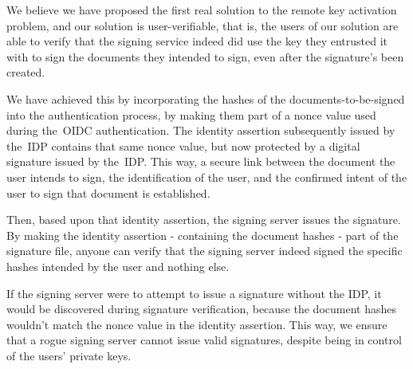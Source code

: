 We believe we have proposed the first real solution to the remote key activation problem,
and our solution is user-verifiable,
that is,
the users of our solution are able to verify that the signing service indeed did use the key they entrusted it with to sign the documents they intended to sign,
even after the signature's been created.

We have achieved this by incorporating the hashes of the documents-to-be-signed into the authentication process,
by making them part of a nonce value used during the~\gls{OIDC} authentication.
The identity assertion subsequently issued by the~\gls{IDP} contains that same nonce value,
but now protected by a digital signature issued by the~\gls{IDP}.
This way, a secure link between the document the user intends to sign,
the identification of the user,
and the confirmed intent of the user to sign that document is established.

Then, based upon that identity assertion, the signing server issues the signature.
By making the identity assertion - containing the document hashes - part of the signature file,
anyone can verify that the signing server indeed signed the specific hashes intended by the user and nothing else.

If the signing server were to attempt to issue a signature without the \gls{IDP},
it would be discovered during signature verification,
because the document hashes wouldn't match the nonce value in the identity assertion.
This way, we ensure that a rogue signing server cannot issue valid signatures,
despite being in control of the users' private keys.

